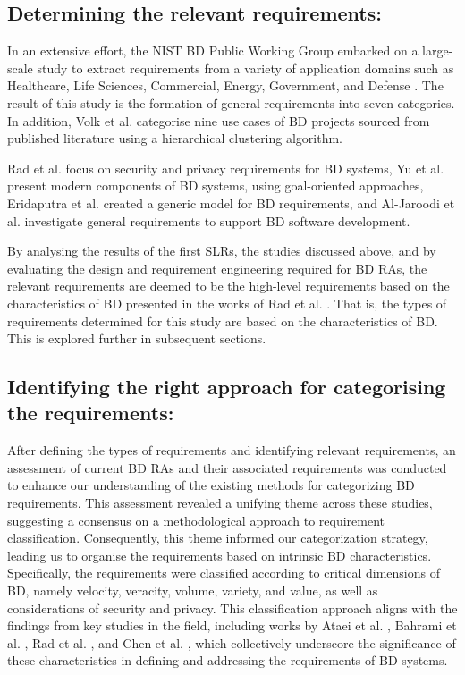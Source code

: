 \documentclass{ieeeaccess}
\begin{document}
\subsection{Determining the relevant requirements:}

In an extensive effort, the NIST BD Public Working Group embarked on a large-scale study to extract requirements from a variety of application domains such as Healthcare, Life Sciences, Commercial, Energy, Government, and Defense \cite{Chang}. The result of this study is the formation of general requirements into seven categories. In addition, Volk et al. \cite{volk2020identifying} categorise nine use cases of BD projects sourced from published literature using a hierarchical clustering algorithm. 

Rad et al. \cite{AtaeiSecurity} focus on security and privacy requirements for BD systems, Yu et al. \cite{yu2019components} present modern components of BD systems, using goal-oriented approaches, Eridaputra et al. \cite{eridaputra2014modeling} created a generic model for BD requirements, and Al-Jaroodi et al. \cite{al2016characteristics} investigate general requirements to support BD software development. 

By analysing the results of the first SLRs, the studies discussed above, and by evaluating the design and requirement engineering required for BD RAs, the relevant requirements are deemed to be the high-level requirements based on the characteristics of BD presented in the works of Rad et al. \cite{Rada2017}. That is, the types of requirements determined for this study are based on the characteristics of BD. This is explored further in subsequent sections.

\subsection{Identifying the right approach for categorising the requirements:}

After defining the types of requirements and identifying relevant requirements, an assessment of current BD RAs and their associated requirements was conducted to enhance our understanding of the existing methods for categorizing BD requirements. This assessment revealed a unifying theme across these studies, suggesting a consensus on a methodological approach to requirement classification. Consequently, this theme informed our categorization strategy, leading us to organise the requirements based on intrinsic BD characteristics. Specifically, the requirements were classified according to critical dimensions of BD, namely velocity, veracity, volume, variety, and value, as well as considerations of security and privacy. This classification approach aligns with the findings from key studies in the field, including works by Ataei et al. \cite{ataei2022state}, Bahrami et al. \cite{Bahrami2015}, Rad et al. \cite{rad2017big}, and Chen et al. \cite{chang2015nist}, which collectively underscore the significance of these characteristics in defining and addressing the requirements of BD systems.
\end{document}
